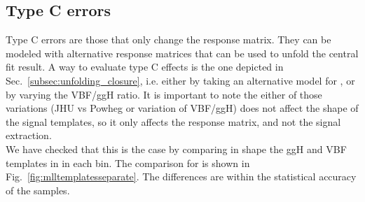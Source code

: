 \subsection{Type C errors}
Type C errors are those that only change the response matrix. They can be modeled with alternative response matrices that can be used to unfold the central fit result. A way to evaluate type C effects is the one depicted in Sec.~\ref{subsec:unfolding_closure}, i.e. either by taking an alternative model for \pth, or by varying the VBF/ggH ratio. It is important to note the either of those variations (JHU vs Powheg or variation of VBF/ggH) does not affect the shape of the signal templates, so it only affects the response matrix, and not the signal extraction.\\
We have checked that this is the case by comparing in shape the ggH and VBF templates in in each \pth bin. The comparison for \mll is shown in Fig.~\ref{fig:mlltemplatesseparate}. The differences are within the statistical accuracy of the samples.
